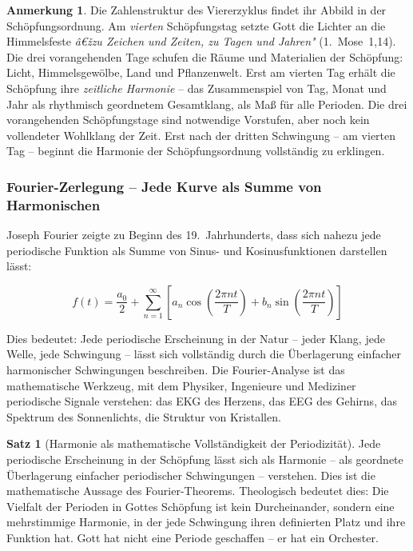 ﻿\documentclass[a4paper,12pt]{article}
\theoremstyle{definition}
\newtheorem{theorem}{Satz}[section]
\newtheorem{remark}{Anmerkung}[section]
\begin{document}
\begin{remark}
	Die Zahlenstruktur des Viererzyklus findet ihr Abbild in der Schöpfungsordnung.
	Am \textit{vierten} Schöpfungstag setzte Gott die Lichter an die Himmelsfeste
	\textit{â€žzu Zeichen und Zeiten, zu Tagen und Jahren"} (1.~Mose~1,14). Die drei
	vorangehenden Tage schufen die Räume und Materialien der Schöpfung: Licht,
	Himmelsgewölbe, Land und Pflanzenwelt. Erst am vierten Tag erhält die Schöpfung
	ihre \textit{zeitliche Harmonie} -- das Zusammenspiel von Tag, Monat und Jahr
	als rhythmisch geordnetem Gesamtklang, als Maß für alle Perioden. Die drei
	vorangehenden Schöpfungstage sind notwendige Vorstufen, aber noch kein vollendeter
	Wohlklang der Zeit. Erst nach der dritten Schwingung -- am vierten Tag -- beginnt
	die Harmonie der Schöpfungsordnung vollständig zu erklingen.
\end{remark}

\subsubsection{Fourier-Zerlegung -- Jede Kurve als Summe von Harmonischen}

Joseph Fourier zeigte zu Beginn des 19.~Jahrhunderts, dass sich nahezu jede
periodische Funktion als Summe von Sinus- und Kosinusfunktionen darstellen lässt:

\begin{equation}
	f(t) = \frac{a_0}{2} + \sum_{n=1}^{\infty}
	\left[ a_n \cos\!\left(\frac{2\pi n t}{T}\right)
	+ b_n \sin\!\left(\frac{2\pi n t}{T}\right) \right]
\end{equation}

Dies bedeutet: Jede periodische Erscheinung in der Natur -- jeder Klang, jede
Welle, jede Schwingung -- lässt sich vollständig durch die Überlagerung einfacher
harmonischer Schwingungen beschreiben. Die Fourier-Analyse ist das mathematische
Werkzeug, mit dem Physiker, Ingenieure und Mediziner periodische Signale verstehen:
das EKG des Herzens, das EEG des Gehirns, das Spektrum des Sonnenlichts, die
Struktur von Kristallen.

\begin{theorem}[Harmonie als mathematische Vollständigkeit der Periodizität]
	Jede periodische Erscheinung in der Schöpfung lässt sich als Harmonie --
	als geordnete Überlagerung einfacher periodischer Schwingungen -- verstehen.
	Dies ist die mathematische Aussage des Fourier-Theorems. Theologisch bedeutet
	dies: Die Vielfalt der Perioden in Gottes Schöpfung ist kein Durcheinander,
	sondern eine mehrstimmige Harmonie, in der jede Schwingung ihren definierten
	Platz und ihre Funktion hat. Gott hat nicht eine Periode geschaffen -- er hat
	ein Orchester.
\end{theorem}
\end{document}
